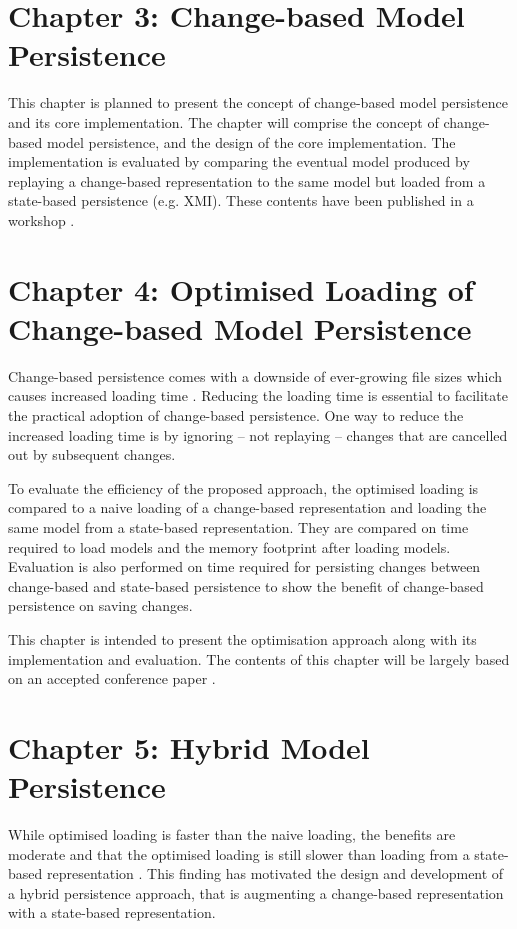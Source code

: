 \documentclass[12pt, a4paper]{report} \usepackage[titletoc]{appendix}
\begin{document}
\section{Chapter 3: Change-based Model Persistence}
\label{sec:chapter_3_Change-based_model_ersistence_plan}
This chapter is planned to present the concept of change-based model persistence and its core implementation. The chapter will comprise the concept of change-based model persistence, and the design of the core implementation. The implementation is evaluated by comparing the eventual model produced by replaying a change-based representation to the same model but loaded from a state-based persistence (e.g. XMI). These contents have been published in a workshop \cite{DBLP:conf/models/YohannisKP17}.


\section{Chapter 4: Optimised Loading of Change-based Model Persistence}
\label{sec:chapter_4_optimised_loading_change_based_model_persistence}

Change-based persistence comes with a downside of ever-growing file sizes \cite{DBLP:journals/entcs/RobbesL07,DBLP:conf/edoc/KoegelHLHD10} which causes increased loading time \cite{mens2002state}. Reducing the loading time is essential to facilitate the practical adoption of change-based persistence. One way to reduce the increased loading time is by ignoring -- not replaying -- changes that are cancelled out by subsequent changes. 

To evaluate the efficiency of the proposed approach, the optimised loading is compared to a naive loading of a change-based representation and loading the same model from a state-based representation. They are compared on time required to load models and the memory footprint after loading models. Evaluation is also performed on time required for persisting changes between change-based and state-based persistence to show the benefit of change-based persistence on saving changes. 

This chapter is intended to present the optimisation approach along with its implementation and evaluation. The contents of this chapter will be largely based on an accepted conference paper \cite{yohannis2018towards}. 


\section{Chapter 5: Hybrid Model Persistence}
\label{sec:chapter_5_hybrid_model_persistence}
While optimised loading is faster than the naive loading, the benefits are moderate and that the optimised loading is still slower than loading from a state-based representation \cite{yohannis2018towards}. This finding has motivated the design and development of a hybrid persistence approach, that is augmenting a change-based representation with a state-based representation. 
\end{document}

